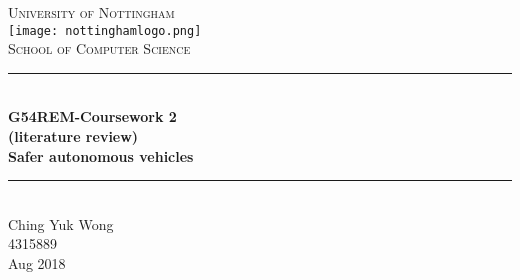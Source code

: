 \begin{titlepage}

\newcommand{\HRule}{\rule{\linewidth}{0.5mm}}

\center


\textsc{\LARGE University of Nottingham}\\[0.8cm]
\texttt{[image: nottinghamlogo.png]}\\[1cm]
\textsc{\Large School of Computer Science}\\[0.5cm]



\HRule \\[0.4cm]
{ \huge \textbf{G54REM-Coursework 2 \\(literature review)}\\
\textbf{Safer autonomous vehicles} }\\[0.1cm]

\HRule \\[1cm]
\Large
Ching Yuk Wong\\
4315889\\[0.5cm]

{\large Aug 2018}\\
\vfill

\end{titlepage}
